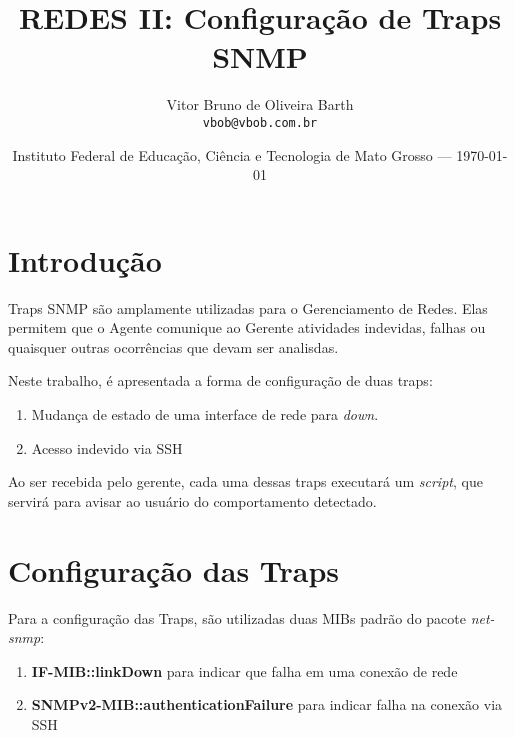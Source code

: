 \documentclass{article}
\title{REDES II: Configuração de Traps SNMP} %
\author{Vitor Bruno de Oliveira Barth\\ \texttt{vbob@vbob.com.br}} %
\date{Instituto Federal de Educação, Ciência e Tecnologia de Mato Grosso --- \today} %
\begin{document}
\maketitle %


\section{Introdução} %

Traps SNMP são amplamente utilizadas para o Gerenciamento de Redes. Elas permitem que o Agente comunique ao Gerente atividades indevidas, falhas ou quaisquer outras ocorrências que devam ser analisdas.

Neste trabalho, é apresentada a forma de configuração de duas traps:

\begin{enumerate}
\item Mudança de estado de uma interface de rede para \textit{down}.
\item Acesso indevido via SSH
\end{enumerate}

Ao ser recebida pelo gerente, cada uma dessas traps executará um \textit{script}, que servirá para avisar ao usuário do comportamento detectado.


\section{Configuração das Traps} %

\par Para a configuração das Traps, são utilizadas duas MIBs padrão do pacote \textit{net-snmp}:

\begin{enumerate}
\item \textbf{IF-MIB::linkDown} para indicar que falha em uma conexão de rede
\item \textbf{SNMPv2-MIB::authenticationFailure} para indicar falha na conexão via SSH
\end{enumerate}
\end{document}
